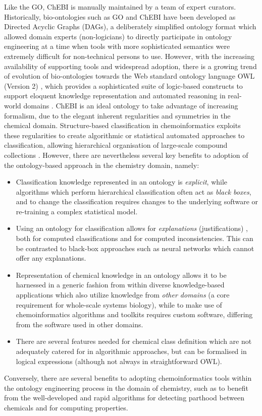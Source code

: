 \documentclass[10pt]{bmc_article}
\newenvironment{bmcformat}{\baselineskip20pt\sloppy\setboolean{publ}{false}}{\baselineskip20pt\sloppy}
\begin{document}
\begin{bmcformat}
Like the GO, ChEBI is manually maintained by a team of expert curators.  Historically, bio-ontologies such as GO and ChEBI have been developed as Directed Acyclic Graphs (DAGs), a deliberately simplified ontology format which allowed domain experts (non-logicians) to directly participate in ontology engineering at a time when tools with more sophisticated semantics were extremely difficult for non-technical persons to use. However, with the increasing availability of supporting tools and widespread adoption, there is a growing trend of evolution of bio-ontologies towards the Web standard ontology language OWL (Version 2) \cite{OWL2NextStep}, which provides a sophisticated suite of logic-based constructs to support eloquent knowledge representation and automated reasoning in real-world domains \cite{alterovitz2010}.  ChEBI is an ideal ontology to take advantage of increasing formalism, due to the elegant inherent regularities and symmetries in the chemical domain.  Structure-based classification in chemoinformatics exploits these regularities to create algorithmic or statistical automated approaches to classification, allowing hierarchical organisation of large-scale compound collections \cite{barnard1992,deshpande2005}. However, there are nevertheless several key benefits to adoption of the ontology-based approach in the chemistry domain, namely:
\begin{itemize}
	\item Classification knowledge represented in an ontology is \textit{explicit}, while algorithms which perform hierarchical classification often act as \textit{black boxes}, and to change the classification requires changes to the underlying software or re-training a complex statistical model.
	\item Using an ontology for classification allows for \textit{explanations} (justifications) \cite{horridgeentail09}, both for computed classifications and for computed inconsistencies. This can be contrasted to black-box approaches such as neural networks which cannot offer any explanations. 
	\item Representation of chemical knowledge in an ontology allows it to be harnessed in a generic fashion from within diverse knowledge-based applications which also utilize knowledge from \textit{other domains} (a core requirement for whole-scale systems biology), while to make use of chemoinformatics algorithms and toolkits requires custom software, differing from the software used in other domains.
	\item There are several features needed for chemical class definition which are not adequately catered for in algorithmic approaches, but can be formalised in logical expressions (although not always in straightforward OWL). 
\end{itemize}
Conversely, there are several benefits to adopting chemoinformatics tools within the ontology engineering process in the domain of chemistry, such as to benefit from the well-developed and rapid algorithms for detecting parthood between chemicals and for computing properties.


\end{bmcformat}
\end{document}
